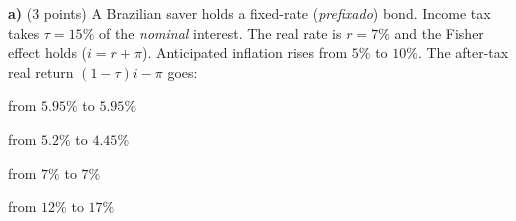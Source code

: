 

\textbf{a)} (3 points) A Brazilian saver holds a fixed-rate (\emph{prefixado}) bond. Income tax takes $\tau=15\%$ of the
\emph{nominal} interest. The real rate is $r=7\%$ and the Fisher effect holds ($i=r+\pi$). Anticipated inflation rises from
$5\%$ to $10\%$. The after-tax real return $(1-\tau)i-\pi$ goes:
\begin{alternativas}
\item from $5.95\%$ to $5.95\%$
\item from $5.2\%$ to $4.45\%$
\item from $7\%$ to $7\%$
\item from $12\%$ to $17\%$
\end{alternativas}

